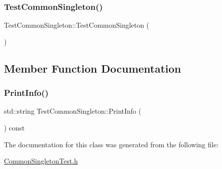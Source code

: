 \subsubsection{\texorpdfstring{TestCommonSingleton()}{TestCommonSingleton()}\hspace{0.1cm}{\footnotesize\ttfamily [2/2]}}
{\footnotesize\ttfamily Test\+Common\+Singleton\+::\+Test\+Common\+Singleton (\begin{DoxyParamCaption}{ }\end{DoxyParamCaption})\hspace{0.3cm}{\ttfamily [inline]}}



\subsection{Member Function Documentation}
\mbox{\label{class_test_common_singleton_a73ae91b8a0a23ae80e43c5effe13448c}} 
\subsubsection{\texorpdfstring{PrintInfo()}{PrintInfo()}}
{\footnotesize\ttfamily std\+::string Test\+Common\+Singleton\+::\+Print\+Info (\begin{DoxyParamCaption}{ }\end{DoxyParamCaption}) const\hspace{0.3cm}{\ttfamily [inline]}}



The documentation for this class was generated from the following file\+:\begin{DoxyCompactItemize}
\item 
\mbox{\hyperlink{_common_singleton_test_8h}{Common\+Singleton\+Test.\+h}}\end{DoxyCompactItemize}
